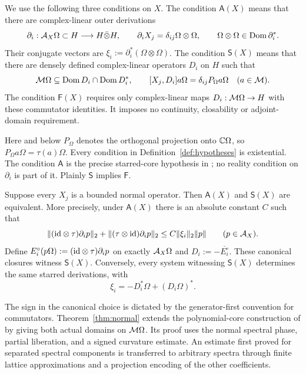 \begin{definition}\label{def:hypotheses}
We use the following three conditions on $X$.
The condition $\mathsf A(X)$ means that there are complex-linear outer derivations
\[
 \partial_i:\mathcal A_X\Omega\subset H\longrightarrow H\bar\otimes H,
 \qquad \partial_iX_j=\delta_{ij}\Omega\otimes\Omega,
 \qquad \Omega\otimes\Omega\in\operatorname{Dom}\partial_i^*.
\]
Their conjugate vectors are $\xi_i:=\partial_i^*(\Omega\otimes\Omega)$.
The condition $\mathsf S(X)$ means that there are densely defined complex-linear operators $D_i$ on $H$ such that
\[
 \mathcal M\Omega\subseteq\operatorname{Dom} D_i\cap\operatorname{Dom} D_i^*,\qquad
 [X_j,D_i]a\Omega=\delta_{ij}P_\Omega a\Omega\quad(a\in\mathcal M).
\]
The condition $\mathsf F(X)$ requires only complex-linear maps $D_i:\mathcal M\Omega\to H$ with these commutator identities.
It imposes no continuity, closability or adjoint-domain requirement.
\end{definition}
Here and below $P_\Omega$ denotes the orthogonal projection onto $\mathbb C\Omega$, so $P_\Omega a\Omega=\tau(a)\Omega$.
Every condition in Definition~\ref{def:hypotheses} is existential.
The condition $\mathsf A$ is the precise starred-core hypothesis in \cite[Proposition~3.5]{ACSY24}; no reality condition on $\partial_i$ is part of it.
Plainly $\mathsf S$ implies $\mathsf F$.

\begin{theorem}\label{thm:normal}
Suppose every $X_j$ is a bounded normal operator.
Then $\mathsf A(X)$ and $\mathsf S(X)$ are equivalent.
More precisely, under $\mathsf A(X)$ there is an absolute constant $C$ such that
\begin{equation}\label{eq:main-slices}
 \| (\mathrm{id}\otimes\tau)\partial_i p\|_2+
 \| (\tau\otimes\mathrm{id})\partial_i p\|_2
 \le C\|\xi_i\|_2\|p\|\qquad(p\in\mathcal A_X).
\end{equation}
Define $E_i^\circ(p\Omega):=(\mathrm{id}\otimes\tau)\partial_i p$ on exactly $\mathcal A_X\Omega$ and $D_i:=-\overline{E_i^\circ}$.
These canonical closures witness $\mathsf S(X)$.
Conversely, every system witnessing $\mathsf S(X)$ determines the same starred derivations, with
\begin{equation}\label{eq:strong-vacuum}
 \xi_i=-D_i^*\Omega+(D_i\Omega)^*.
\end{equation}
\end{theorem}

The sign in the canonical choice is dictated by the generator-first convention for commutators.
Theorem~\ref{thm:normal} extends the polynomial-core construction of \cite[Theorem~3.4]{ACSY24} by giving both actual domains on $\mathcal M\Omega$.
Its proof uses the normal spectral phase, partial liberation, and a signed curvature estimate.
An estimate first proved for separated spectral components is transferred to arbitrary spectra through finite lattice approximations and a projection encoding of the other coefficients.

